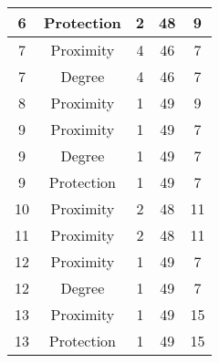 \documentclass[results.tex]{subfiles}
\begin{document}
\begin{center}
\begin{tabular}{| c || c | c | c | c |}
            \hline
            6                       & Protection                   & 2                      & 48                      & 9                    \\
            \hline
            7                       & Proximity                    & 4                      & 46                      & 7                    \\
            \hline
            7                       & Degree                       & 4                      & 46                      & 7                    \\
            \hline
            8                       & Proximity                    & 1                      & 49                      & 9                    \\
            \hline
            9                       & Proximity                    & 1                      & 49                      & 7                    \\
            \hline
            9                       & Degree                       & 1                      & 49                      & 7                    \\
            \hline
            9                       & Protection                   & 1                      & 49                      & 7                    \\
            \hline
            10                      & Proximity                    & 2                      & 48                      & 11                   \\
            \hline
            11                      & Proximity                    & 2                      & 48                      & 11                   \\
            \hline
            12                      & Proximity                    & 1                      & 49                      & 7                    \\
            \hline
            12                      & Degree                       & 1                      & 49                      & 7                    \\
            \hline
            13                      & Proximity                    & 1                      & 49                      & 15                   \\
            \hline
            13                      & Protection                   & 1                      & 49                      & 15                   \\

\end{tabular}
\end{center}
\end{document}
